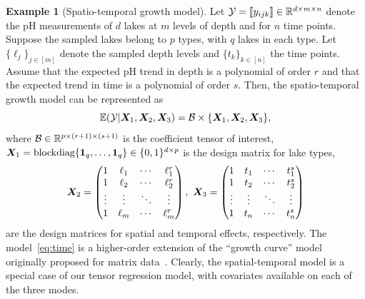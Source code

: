 \documentclass{article}
\theoremstyle{plain}
\theoremstyle{definition}
\newtheorem{example}{Example}
\begin{document}
\begin{example}[Spatio-temporal growth model]
Let $\mathcal{Y}=\llbracket y_{ijk} \rrbracket\in\mathbb{R}^{d \times m\times n}$ denote the pH measurements of $d$ lakes at $m$ levels of depth and for $n$ time points. Suppose the sampled lakes belong to $p$ types, with $q$ lakes in each type. Let $\{\ell_j\}_{j\in[m]}$ denote the sampled depth levels and $\{t_k\}_{k\in[n]}$ the time points. Assume that the expected pH trend in depth is a polynomial of order $r$ and that the expected trend in time is a polynomial of order $s$. Then, the spatio-temporal growth model can be represented as
\begin{equation}\label{eq:time}
\mathbb{E}(\mathcal{Y}|\bm X_1,\bm X_2,\bm X_3)=\mathcal{B}\times\{\bm X_1,\bm X_2,\bm X_3\},
\end{equation}
where $\mathcal{B}\in\mathbb{R}^{p\times (r+1)\times (s+1)}$ is the coefficient tensor of interest, $\bm X_1=\text{blockdiag}\{\mathbf{1}_q,\ldots,\mathbf{1}_q\}\in \{0,1\}^{d\times p}$ is the design matrix for lake types, 
\[
\bm X_2=
\begin{pmatrix}
1 & \ell_1&\cdots &\ell^{r}_1\\
1 & \ell_2&\cdots &\ell^{r}_2\\
\vdots &\vdots&\ddots&\vdots\\
1&\ell_{m}&\cdots&\ell^{r}_{m}
\end{pmatrix},\
\bm X_3=
\begin{pmatrix}
1 & t_1&\cdots &t^{s}_1\\
1 & t_2&\cdots &t^{s}_2\\
\vdots &\vdots&\ddots&\vdots\\
1&t_{n}&\cdots&t^{s}_{n}
\end{pmatrix}
\]
are the design matrices for spatial and temporal effects, respectively. The model~\eqref{eq:time} is a higher-order extension of the ``growth curve'' model originally proposed for matrix data~\cite{gabriel1998generalised,potthoff1964generalized,srivastava2008models}. Clearly, the spatial-temporal model is a special case of our tensor regression model, with covariates available on each of the three modes. 

\end{example}
\end{document}
